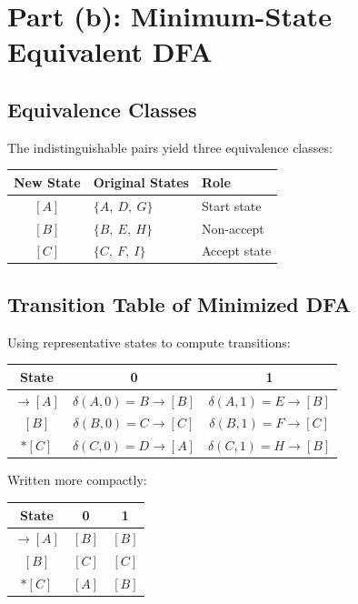 \documentclass{article}
\theoremstyle{theorem}
\theoremstyle{definition}
\theoremstyle{remark}
\begin{document}
\section*{Part (b): Minimum-State Equivalent DFA}

\subsection*{Equivalence Classes}

The indistinguishable pairs yield three equivalence classes:

\begin{center}
\begin{tabular}{cll}
\toprule
\textbf{New State} & \textbf{Original States} & \textbf{Role} \\
\midrule
$[A]$ & $\{A,\ D,\ G\}$ & Start state \\
$[B]$ & $\{B,\ E,\ H\}$ & Non-accept \\
$[C]$ & $\{C,\ F,\ I\}$ & Accept state \\
\bottomrule
\end{tabular}
\end{center}

\subsection*{Transition Table of Minimized DFA}

Using representative states to compute transitions:

\begin{center}
\begin{tabular}{c||c|c}
\toprule
\textbf{State} & \textbf{0} & \textbf{1} \\
\midrule
$\rightarrow [A]$ & $\delta(A,0)=B \to [B]$ & $\delta(A,1)=E \to [B]$ \\
$[B]$             & $\delta(B,0)=C \to [C]$ & $\delta(B,1)=F \to [C]$ \\
$*[C]$            & $\delta(C,0)=D \to [A]$ & $\delta(C,1)=H \to [B]$ \\
\bottomrule
\end{tabular}
\end{center}

\medskip
Written more compactly:

\begin{center}
\begin{tabular}{c||c|c}
\toprule
\textbf{State} & \textbf{0} & \textbf{1} \\
\midrule
$\rightarrow [A]$ & $[B]$ & $[B]$ \\
$[B]$             & $[C]$ & $[C]$ \\
$*[C]$            & $[A]$ & $[B]$ \\
\bottomrule
\end{tabular}
\end{center}
\end{document}
